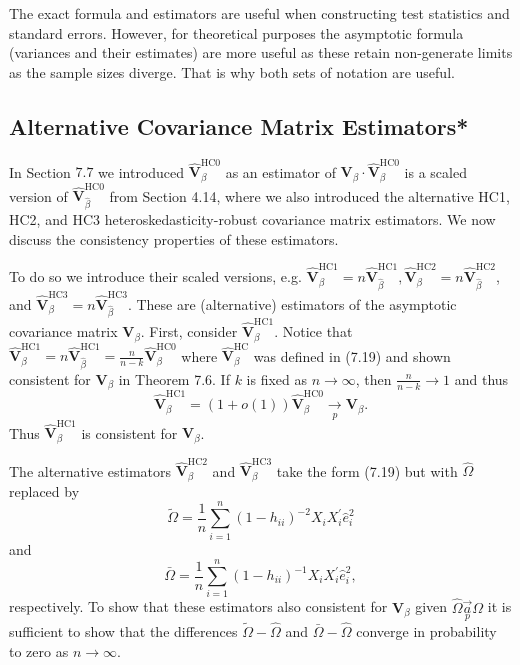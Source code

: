 \documentclass[10pt]{article}
\begin{document}
The exact formula and estimators are useful when constructing test statistics and standard errors. However, for theoretical purposes the asymptotic formula (variances and their estimates) are more useful as these retain non-generate limits as the sample sizes diverge. That is why both sets of notation are useful.

\subsection{Alternative Covariance Matrix Estimators*}
In Section $7.7$ we introduced $\widehat{\boldsymbol{V}}_{\beta}^{\mathrm{HC} 0}$ as an estimator of $\boldsymbol{V}_{\beta} \cdot \widehat{\boldsymbol{V}}_{\beta}^{\mathrm{HC} 0}$ is a scaled version of $\widehat{\boldsymbol{V}}_{\widehat{\beta}}^{\mathrm{HC} 0}$ from Section 4.14, where we also introduced the alternative HC1, HC2, and HC3 heteroskedasticity-robust covariance matrix estimators. We now discuss the consistency properties of these estimators.

To do so we introduce their scaled versions, e.g. $\widehat{\boldsymbol{V}}_{\beta}^{\mathrm{HC} 1}=n \widehat{\boldsymbol{V}}_{\widehat{\beta}}^{\mathrm{HC} 1}, \widehat{\boldsymbol{V}}_{\beta}^{\mathrm{HC} 2}=n \widehat{\boldsymbol{V}}_{\widehat{\beta}}^{\mathrm{HC} 2}$, and $\widehat{\boldsymbol{V}}_{\beta}^{\mathrm{HC} 3}=n \widehat{\boldsymbol{V}}_{\widehat{\beta}}^{\mathrm{HC} 3}$. These are (alternative) estimators of the asymptotic covariance matrix $\boldsymbol{V}_{\beta}$. First, consider $\widehat{\boldsymbol{V}}_{\beta}^{\mathrm{HC} 1}$. Notice that $\widehat{\boldsymbol{V}}_{\beta}^{\mathrm{HC} 1}=n \widehat{\boldsymbol{V}}_{\widehat{\beta}}^{\mathrm{HC1}}=\frac{n}{n-k} \widehat{\boldsymbol{V}}_{\beta}^{\mathrm{HC} 0}$ where $\widehat{\boldsymbol{V}}_{\beta}^{\mathrm{HC}}$ was defined in (7.19) and shown consistent for $\boldsymbol{V}_{\beta}$ in Theorem 7.6. If $k$ is fixed as $n \rightarrow \infty$, then $\frac{n}{n-k} \rightarrow 1$ and thus
$$
\widehat{\boldsymbol{V}}_{\beta}^{\mathrm{HC} 1}=(1+o(1)) \widehat{\boldsymbol{V}}_{\beta}^{\mathrm{HC} 0} \underset{p}{\longrightarrow} \boldsymbol{V}_{\beta} .
$$
Thus $\widehat{\boldsymbol{V}}_{\beta}^{\mathrm{HC} 1}$ is consistent for $\boldsymbol{V}_{\beta}$.

The alternative estimators $\widehat{\boldsymbol{V}}_{\beta}^{\mathrm{HC} 2}$ and $\widehat{\boldsymbol{V}}_{\beta}^{\mathrm{HC} 3}$ take the form (7.19) but with $\widehat{\Omega}$ replaced by
$$
\widetilde{\Omega}=\frac{1}{n} \sum_{i=1}^{n}\left(1-h_{i i}\right)^{-2} X_{i} X_{i}^{\prime} \widehat{e}_{i}^{2}
$$
and
$$
\bar{\Omega}=\frac{1}{n} \sum_{i=1}^{n}\left(1-h_{i i}\right)^{-1} X_{i} X_{i}^{\prime} \hat{e}_{i}^{2},
$$
respectively. To show that these estimators also consistent for $\boldsymbol{V}_{\beta}$ given $\widehat{\Omega} \underset{p}{\vec{a}} \Omega$ it is sufficient to show that the differences $\widetilde{\Omega}-\widehat{\Omega}$ and $\bar{\Omega}-\widehat{\Omega}$ converge in probability to zero as $n \rightarrow \infty$.
\end{document}
